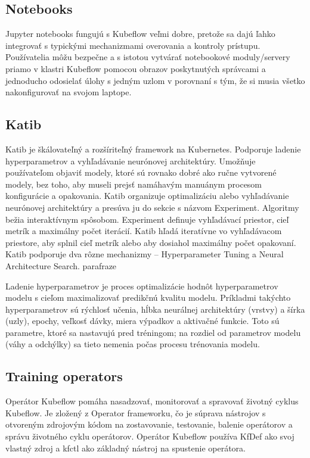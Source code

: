 \subsection*{Notebooks}

Jupyter notebooks fungujú s Kubeflow veľmi dobre, pretože sa dajú ľahko integrovať s typickými mechanizmami overovania a kontroly prístupu. Používatelia môžu bezpečne a s istotou vytvárať notebookové moduly/servery priamo v klastri Kubeflow pomocou obrazov poskytnutých správcami a jednoducho odosielať úlohy s jedným uzlom v porovnaní s tým, že si musia všetko nakonfigurovať na svojom laptope.


\subsection*{Katib}

Katib je škálovateľný a rozšíriteľný framework na Kubernetes. Podporuje ladenie hyperparametrov a vyhľadávanie neurónovej architektúry. Umožňuje používateľom objaviť modely, ktoré sú rovnako dobré ako ručne vytvorené modely, bez toho, aby museli prejsť namáhavým manuánym procesom konfigurácie a opakovania. Katib organizuje optimalizáciu alebo vyhľadávanie neurónovej architektúry a presúva ju do sekcie s názvom Experiment. Algoritmy bežia interaktívnym spôsobom. Experiment definuje vyhľadávací priestor, cieľ metrík a maximálny počet iterácií. Katib hľadá iteratívne vo vyhľadávacom priestore, aby splnil cieľ metrík alebo aby dosiahol maximálny počet opakovaní. Katib podporuje dva rôzne mechanizmy – Hyperparameter Tuning a Neural Architecture Search. parafraze

Ladenie hyperparametrov je proces optimalizácie hodnôt hyperparametrov modelu s cieľom maximalizovať predikčnú kvalitu modelu. Príkladmi takýchto hyperparametrov sú rýchlosť učenia, hĺbka neurálnej architektúry (vrstvy) a šírka (uzly), epochy, veľkosť dávky, miera výpadkov a aktivačné funkcie. Toto sú parametre, ktoré sa nastavujú pred tréningom; na rozdiel od parametrov modelu (váhy a odchýlky) sa tieto nemenia počas procesu trénovania modelu.

\subsection*{Training operators}

Operátor Kubeflow pomáha nasadzovať, monitorovať a spravovať životný cyklus Kubeflow. Je zložený z Operator frameworku, čo je súprava nástrojov s otvoreným zdrojovým kódom na zostavovanie, testovanie, balenie operátorov a správu životného cyklu operátorov. Operátor Kubeflow používa KfDef ako svoj vlastný zdroj a kfctl ako základný nástroj na spustenie operátora.

